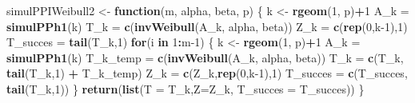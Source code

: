 \documentclass[
]{article}
\newenvironment{Shaded}{\begin{snugshade}}{\end{snugshade}}
\newcommand{\AttributeTok}[1]{\textcolor[rgb]{0.13,0.29,0.53}{#1}}
\newcommand{\ControlFlowTok}[1]{\textcolor[rgb]{0.13,0.29,0.53}{\textbf{#1}}}
\newcommand{\DecValTok}[1]{\textcolor[rgb]{0.00,0.00,0.81}{#1}}
\newcommand{\FloatTok}[1]{\textcolor[rgb]{0.00,0.00,0.81}{#1}}
\newcommand{\FunctionTok}[1]{\textcolor[rgb]{0.13,0.29,0.53}{\textbf{#1}}}
\newcommand{\NormalTok}[1]{#1}
\newcommand{\OtherTok}[1]{\textcolor[rgb]{0.56,0.35,0.01}{#1}}
\newcommand{\SpecialCharTok}[1]{\textcolor[rgb]{0.81,0.36,0.00}{\textbf{#1}}}
\begin{document}
\begin{Shaded}
\begin{Highlighting}[]
\NormalTok{simulPPIWeibull2 }\OtherTok{\textless{}{-}} \ControlFlowTok{function}\NormalTok{(m, alpha, beta, p)}
\NormalTok{\{}
\NormalTok{  k }\OtherTok{\textless{}{-}} \FunctionTok{rgeom}\NormalTok{(}\DecValTok{1}\NormalTok{, p)}\SpecialCharTok{+}\DecValTok{1}
\NormalTok{  A\_k }\OtherTok{=} \FunctionTok{simulPPh1}\NormalTok{(k)}
\NormalTok{  T\_k }\OtherTok{=} \FunctionTok{c}\NormalTok{(}\FunctionTok{invWeibull}\NormalTok{(A\_k, alpha, beta))}
\NormalTok{  Z\_k }\OtherTok{=} \FunctionTok{c}\NormalTok{(}\FunctionTok{rep}\NormalTok{(}\DecValTok{0}\NormalTok{,k}\DecValTok{{-}1}\NormalTok{),}\DecValTok{1}\NormalTok{)}
\NormalTok{  T\_succes }\OtherTok{=} \FunctionTok{tail}\NormalTok{(T\_k,}\DecValTok{1}\NormalTok{)}
  \ControlFlowTok{for}\NormalTok{(i }\ControlFlowTok{in} \DecValTok{1}\SpecialCharTok{:}\NormalTok{m}\DecValTok{{-}1}\NormalTok{)}
\NormalTok{  \{}
\NormalTok{   k }\OtherTok{\textless{}{-}} \FunctionTok{rgeom}\NormalTok{(}\DecValTok{1}\NormalTok{, p)}\SpecialCharTok{+}\DecValTok{1}
\NormalTok{   A\_k }\OtherTok{=} \FunctionTok{simulPPh1}\NormalTok{(k)}
\NormalTok{   T\_k\_temp }\OtherTok{=} \FunctionTok{c}\NormalTok{(}\FunctionTok{invWeibull}\NormalTok{(A\_k, alpha, beta))}
\NormalTok{   T\_k }\OtherTok{=} \FunctionTok{c}\NormalTok{(T\_k, }\FunctionTok{tail}\NormalTok{(T\_k,}\DecValTok{1}\NormalTok{) }\SpecialCharTok{+}\NormalTok{ T\_k\_temp)}
\NormalTok{   Z\_k }\OtherTok{=} \FunctionTok{c}\NormalTok{(Z\_k,}\FunctionTok{rep}\NormalTok{(}\DecValTok{0}\NormalTok{,k}\DecValTok{{-}1}\NormalTok{),}\DecValTok{1}\NormalTok{)}
\NormalTok{   T\_succes }\OtherTok{=} \FunctionTok{c}\NormalTok{(T\_succes, }\FunctionTok{tail}\NormalTok{(T\_k,}\DecValTok{1}\NormalTok{))}
\NormalTok{  \}}
  \FunctionTok{return}\NormalTok{(}\FunctionTok{list}\NormalTok{(}\AttributeTok{T =}\NormalTok{ T\_k,}\AttributeTok{Z=}\NormalTok{Z\_k, }\AttributeTok{T\_succes =}\NormalTok{ T\_succes))}
\NormalTok{\}}
\end{Highlighting}
\end{Shaded}

\begin{Shaded}
\end{Shaded}
\end{document}
